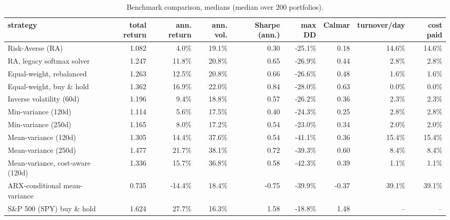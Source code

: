 \begin{table}[ht!]
\centering
\footnotesize
\setlength{\tabcolsep}{4pt}
\begin{tabular}{lrrrrrrrr}
\hline
strategy & total return & ann. return & ann. vol. & Sharpe (ann.) & max DD & Calmar & turnover/day & cost paid \\
\hline
Risk-Averse (RA) & 1.082 & 4.0\% & 19.1\% & 0.30 & -25.1\% & 0.18 & 14.6\% & 14.6\% \\
RA, legacy softmax solver & 1.247 & 11.8\% & 20.8\% & 0.65 & -26.9\% & 0.44 & 2.8\% & 2.8\% \\
Equal-weight, rebalanced & 1.263 & 12.5\% & 20.8\% & 0.66 & -26.6\% & 0.48 & 1.6\% & 1.6\% \\
Equal-weight, buy \& hold & 1.362 & 16.9\% & 22.0\% & 0.84 & -28.0\% & 0.63 & 0.0\% & 0.0\% \\
Inverse volatility (60d) & 1.196 & 9.4\% & 18.8\% & 0.57 & -26.2\% & 0.36 & 2.3\% & 2.3\% \\
Min-variance (120d) & 1.114 & 5.6\% & 17.5\% & 0.40 & -24.3\% & 0.25 & 2.8\% & 2.8\% \\
Min-variance (250d) & 1.165 & 8.0\% & 17.2\% & 0.54 & -23.0\% & 0.34 & 2.0\% & 2.0\% \\
Mean-variance (120d) & 1.305 & 14.4\% & 37.6\% & 0.54 & -41.1\% & 0.36 & 15.4\% & 15.4\% \\
Mean-variance (250d) & 1.477 & 21.7\% & 38.1\% & 0.72 & -39.3\% & 0.60 & 8.4\% & 8.4\% \\
Mean-variance, cost-aware (120d) & 1.336 & 15.7\% & 36.8\% & 0.58 & -42.3\% & 0.39 & 1.1\% & 1.1\% \\
ARX-conditional mean-variance & 0.735 & -14.4\% & 18.4\% & -0.75 & -39.9\% & -0.37 & 39.1\% & 39.1\% \\
S\&P 500 (SPY) buy \& hold & 1.624 & 27.7\% & 16.3\% & 1.58 & -18.8\% & 1.48 & -- & -- \\
\hline
\end{tabular}
\caption{Benchmark comparison, medians (median over 200 portfolios).}
\label{tab:bench_median}
\end{table}
